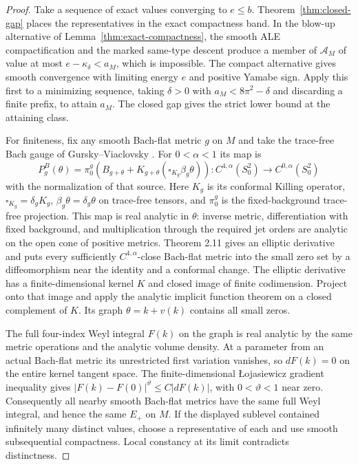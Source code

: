 \begin{proof}
Take a sequence of exact values converging to \(e\le b\).
Theorem~\ref{thm:closed-gap} places the representatives in the
exact compactness band. In the blow-up alternative of
Lemma~\ref{thm:exact-compactness}, the smooth ALE compactification
and the marked same-type descent produce a member of
\(\mathcal A_M\) of value at most
\(e-\kappa_\delta<a_M\), which is impossible. The compact
alternative gives smooth convergence with limiting energy \(e\)
and positive Yamabe sign. Apply this first to a minimizing
sequence, taking \(\delta>0\) with \(a_M<8\pi^2-\delta\) and
discarding a finite prefix, to attain \(a_M\). The closed gap
gives the strict lower bound at the attaining class.

For finiteness, fix any smooth Bach-flat metric \(g\) on \(M\)
and take the trace-free Bach gauge of Gursky--Viaclovsky
\cite[\S2.3, equation (2.59) and Theorem 2.11]{GurskyViaclovsky2015}.
For \(0<\alpha<1\) its map is
\[
 P_g^B(\theta)=\pi_0^g\!
     \left(B_{g+\theta}
         +K_{g+\theta}(\square_{K_g}\beta_g\theta)\right)
 : C^{4,\alpha}(S^2_0)\longrightarrow C^{0,\alpha}(S^2_0)
\]
with the normalization of that source. Here \(K_g\) is its conformal
Killing operator, \(\square_{K_g}=\delta_g K_g\),
\(\beta_g\theta=\delta_g\theta\) on trace-free tensors, and \(\pi_0^g\)
is the fixed-background trace-free projection. This map is real
analytic in \(\theta\): inverse metric, differentiation with fixed
background, and multiplication through the required jet orders
are analytic on the open cone of positive metrics. Theorem 2.11
gives an elliptic derivative and puts every sufficiently
\(C^{4,\alpha}\)-close Bach-flat metric into the small zero set by
a diffeomorphism near the identity and a conformal change.
The elliptic derivative has a finite-dimensional kernel \(K\)
and closed image of finite codimension. Project onto that image
and apply the analytic implicit function theorem on a closed
complement of \(K\). Its graph \(\theta=k+v(k)\) contains all
small zeros.

The full four-index Weyl integral \(F(k)\) on the graph is
real analytic by the same metric operations and the analytic
volume density. At a parameter from an actual Bach-flat metric
its unrestricted first variation vanishes, so \(dF(k)=0\) on
the entire kernel tangent space. The finite-dimensional
\L{}ojasiewicz gradient inequality
\cite[Theorem 1]{Feehan2020Gradient} gives
\(|F(k)-F(0)|^\vartheta\le C|dF(k)|\), with
\(0<\vartheta<1\) near zero. Consequently all nearby smooth
Bach-flat metrics have the same full Weyl integral, and hence
the same \(E_+\) on \(M\). If the displayed sublevel contained
infinitely many distinct values, choose a representative
of each and use smooth subsequential compactness. Local constancy
at its limit contradicts distinctness.
\end{proof}

